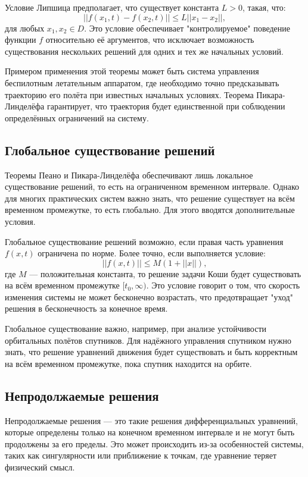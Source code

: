 \documentclass[a4paper,14pt]{extarticle} %
\begin{document}
Условие Липшица предполагает, что существует константа \( L > 0 \), такая, что:
\[
||f(x_1, t) - f(x_2, t)|| \leq L||x_1 - x_2||,
\]
для любых \( x_1, x_2 \in D \). Это условие обеспечивает "контролируемое" поведение функции \( f \) относительно её аргументов, что исключает возможность существования нескольких решений для одних и тех же начальных условий.

Примером применения этой теоремы может быть система управления беспилотным летательным аппаратом, где необходимо точно предсказывать траекторию его полёта при известных начальных условиях. Теорема Пикара-Линделёфа гарантирует, что траектория будет единственной при соблюдении определённых ограничений на систему.

\subsection{Глобальное существование решений}
Теоремы Пеано и Пикара-Линделёфа обеспечивают лишь локальное существование решений, то есть на ограниченном временном интервале. Однако для многих практических систем важно знать, что решение существует на всём временном промежутке, то есть глобально. Для этого вводятся дополнительные условия.

Глобальное существование решений возможно, если правая часть уравнения \( f(x, t) \) ограничена по норме. Более точно, если выполняется условие:
\[
||f(x, t)|| \leq M(1 + ||x||),
\]
где \( M \) — положительная константа, то решение задачи Коши будет существовать на всём временном промежутке \( [t_0, \infty) \). Это условие говорит о том, что скорость изменения системы не может бесконечно возрастать, что предотвращает "уход" решения в бесконечность за конечное время.

Глобальное существование важно, например, при анализе устойчивости орбитальных полётов спутников. Для надёжного управления спутником нужно знать, что решение уравнений движения будет существовать и быть корректным на всём временном промежутке, пока спутник находится на орбите.

\subsection{Непродолжаемые решения}
Непродолжаемые решения — это такие решения дифференциальных уравнений, которые определены только на конечном временном интервале и не могут быть продолжены за его пределы. Это может происходить из-за особенностей системы, таких как сингулярности или приближение к точкам, где уравнение теряет физический смысл.
\end{document}
